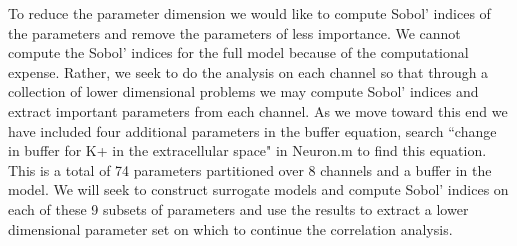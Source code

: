 \documentclass{article}
\begin{document}
To reduce the parameter dimension we would like to compute Sobol' indices of the parameters and remove the parameters of less importance. We cannot compute the Sobol' indices for the full model because of the computational expense. Rather, we seek to do the analysis on each channel so that through a collection of lower dimensional problems we may compute Sobol' indices and extract important parameters from each channel. As we move toward this end we have included four additional parameters in the buffer equation, search ``change in buffer for K+ in the extracellular space" in Neuron.m to find this equation. This is a total of 74 parameters partitioned over 8 channels and a buffer in the model. We will seek to construct surrogate models and compute Sobol' indices on each of these 9 subsets of parameters and use the results to extract a lower dimensional parameter set on which to continue the correlation analysis.
\end{document}
